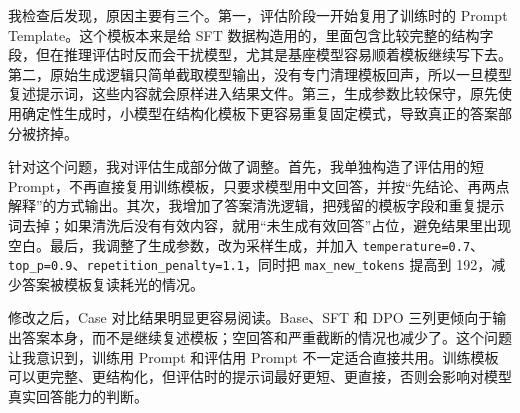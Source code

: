 \documentclass[a4paper,12pt]{ctexart}
\begin{document}
我检查后发现，原因主要有三个。第一，评估阶段一开始复用了训练时的 Prompt Template。这个模板本来是给 SFT 数据构造用的，里面包含比较完整的结构字段，但在推理评估时反而会干扰模型，尤其是基座模型容易顺着模板继续写下去。第二，原始生成逻辑只简单截取模型输出，没有专门清理模板回声，所以一旦模型复述提示词，这些内容就会原样进入结果文件。第三，生成参数比较保守，原先使用确定性生成时，小模型在结构化模板下更容易重复固定模式，导致真正的答案部分被挤掉。

针对这个问题，我对评估生成部分做了调整。首先，我单独构造了评估用的短 Prompt，不再直接复用训练模板，只要求模型用中文回答，并按“先结论、再两点解释”的方式输出。其次，我增加了答案清洗逻辑，把残留的模板字段和重复提示词去掉；如果清洗后没有有效内容，就用“未生成有效回答”占位，避免结果里出现空白。最后，我调整了生成参数，改为采样生成，并加入 \texttt{temperature=0.7}、\texttt{top\_p=0.9}、\texttt{repetition\_penalty=1.1}，同时把 \texttt{max\_new\_tokens} 提高到 192，减少答案被模板复读耗光的情况。

修改之后，Case 对比结果明显更容易阅读。Base、SFT 和 DPO 三列更倾向于输出答案本身，而不是继续复述模板；空回答和严重截断的情况也减少了。这个问题让我意识到，训练用 Prompt 和评估用 Prompt 不一定适合直接共用。训练模板可以更完整、更结构化，但评估时的提示词最好更短、更直接，否则会影响对模型真实回答能力的判断。
\end{document}
